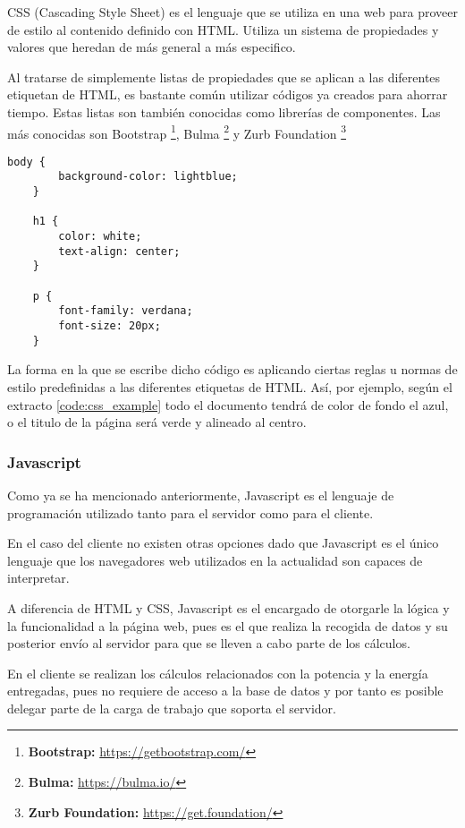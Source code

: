 CSS (Cascading Style Sheet) es el lenguaje que se utiliza en una web para proveer de estilo al contenido definido con HTML. Utiliza un sistema de propiedades y valores que heredan de más general a más especifico. 

Al tratarse de simplemente listas de propiedades que se aplican a las diferentes etiquetan de HTML, es bastante común utilizar códigos ya creados para ahorrar tiempo. Estas listas son también conocidas como librerías de componentes. Las más conocidas son Bootstrap \footnote{\textbf{Bootstrap:} \url{https://getbootstrap.com/} }, Bulma \footnote{\textbf{Bulma:} \url{https://bulma.io/} }  y Zurb Foundation \footnote{\textbf{Zurb Foundation:} \url{https://get.foundation/} }

\begin{lstlisting}[style=ES6, caption={Ejemplo de código CSS \label{code:css_example}}]
	body {
  		background-color: lightblue;
	}

	h1 {
  		color: white;
  		text-align: center;
	}

	p {
  		font-family: verdana;
  		font-size: 20px;
	}
\end{lstlisting}

La forma en la que se escribe dicho código es aplicando ciertas reglas u normas de estilo predefinidas a las diferentes etiquetas de HTML. Así, por ejemplo, según el extracto \ref{code:css_example} todo el documento tendrá de color de fondo el azul, o el titulo de la página será verde y alineado al centro.


\subsubsection{Javascript}
Como ya se ha mencionado anteriormente, Javascript es el lenguaje de programación utilizado tanto para el servidor como para el cliente. 

En el caso del cliente no existen otras opciones dado que Javascript es el único lenguaje que los navegadores web utilizados en la actualidad son capaces de interpretar.

A diferencia de HTML y CSS, Javascript es el encargado de otorgarle la lógica y la funcionalidad a la página web, pues es el que realiza la recogida de datos y su posterior envío al servidor para que se lleven a cabo parte de los cálculos.

En el cliente se realizan los cálculos relacionados con la potencia y la energía entregadas, pues no requiere de acceso a la base de datos y por tanto es posible delegar parte de la carga de trabajo que soporta el servidor.


